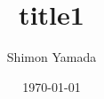 \documentclass[a4j,twocolumn]{jarticle}
\title{\LARGE{title1}}
\author{\large{Shimon Yamada}}
\date{\today}
\begin{document}
\maketitle



\section{}
\end{document}
